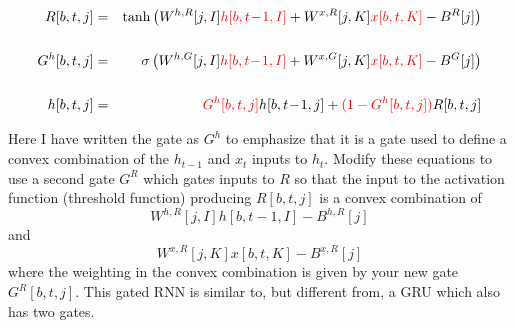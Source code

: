 \documentclass{article}
\newcommand{\solution}[1]{}
\begin{document}
\begin{eqnarray*}
R[b,t,j] & = & \mathrm{tanh}\left(W^{h,R}[j,I]{\color{red} h[b,t\!-\!1,I]} + W^{x,R}[j,K]{\color{red} x[b,t,K]} - B^R[j]\right) \\
\\
G^h[b,t,j] & = & \sigma\left(W^{h,G}[j,I]{\color{red} h[b,t\!-\!1,I]} + W^{x,G}[j,K]{\color{red} x[b,t,K]} - B^G[j]\right) \\
\\
h[b,t,j] & = & {\color{red} G^h[b,t,j]}h[b,t\!-\!1,j] + {\color{red} (1-G^h[b,t,j])}R[b,t,j]
\end{eqnarray*}

Here I have written the gate as $G^h$ to emphasize that it is a gate used to define a convex combination of the $h_{t-1}$ and $x_t$ inputs to $h_t$. Modify these equations to use a second gate $G^R$
which gates inputs to $R$
so that the input to the activation function (threshold function) producing $R[b,t,j]$ is a convex combination of
$$W^{h,R}[j,I] h[b,t\!-\!1,I] - B^{h,R}[j]$$
and
$$W^{x,R}[j,K] x[b,t,K] - B^{x,R}[j]$$
where the weighting in the convex combination is given by your new gate $G^R[b,t,j]$.
This gated RNN is similar to, but different from, a GRU which also has two gates.

\solution{
  \begin{eqnarray*}
    G^R[b,t,j] & = & \sigma\left(W^{h,GR}[j,I]{\color{red} h[b,t\!-\!1,I]} + W^{x,GR}[j,K]{\color{red} x[b,t,K]} - B^{GR}R[j]\right) \\
    \\
    R[b,t,j] & = & \mathrm{tanh}\left(\begin{array}{l}G^R[b,t,j]\;(W^{h,R}[j,I]{\color{red} h[b,t\!-\!1,I]} - B^{h,R}[j]) \\ \\ +\;\; (1-G^R[b,t,j])\;(W^{x,R}[j,K]{\color{red} x[b,t,K]} - B^{x,R}[j])\end{array}\right) \\
    \\
      \\
      G^h[b,t,j] & = & \sigma\left(W^{h,Gh}[j,I]{\color{red} h[b,t\!-\!1,I]} + W^{x,Gh}[j,K]{\color{red} x[b,t,K]} - B^{Gh}[j]\right) \\
      \\
      h[b,t,j] & = & {\color{red} G^h[b,t,j]}h[b,t\!-\!1,j] + {\color{red} (1-G^h[b,t,j])}R[b,t,j]
\end{eqnarray*}
    }
\end{document}
